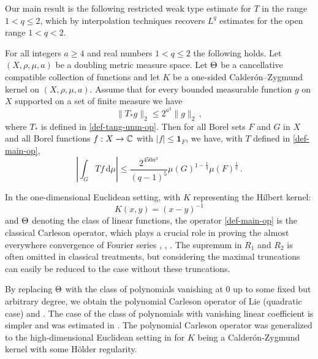 Our main result  is the following restricted weak type estimate for $T$ in the range $1<q\le 2$, which by interpolation techniques recovers $L^q$ estimates for the open range
$1<q<2$.
\begin{theorem}
\label{metric-space-Carleson}
    For all  integers $a \ge  4$ and  real numbers $1<q\le 2$
    the following holds.
    Let $(X,\rho,\mu,a)$ be a doubling metric measure space. Let  ${\Theta}$ be a
    cancellative compatible  collection of functions and let $K$ be a one-sided Calder\'on--Zygmund kernel on $(X,\rho,\mu,a)$. Assume  that for every bounded measurable function $g$ on $X$ supported on a set of finite measure we have
    \begin{equation}\label{nontanbound}
        \|T_{*}g\|_{2} \leq 2^{a^3} \|g\|_2\,,
    \end{equation}
    where $T_{*}$ is defined in
\eqref{def-tang-unm-op}.
    Then for all Borel sets $F$ and $G$ in $X$ and
    all Borel functions $f:X\to {\mathbb{C}}$ with
    $|f|\le \mathbf{1}_F$, we have, with $T$ defined in  \eqref{def-main-op},
    \begin{equation}
    \label{resweak}
        \left|\int_{G} T f \, \mathrm{d}\mu\right| \leq \frac{2^{450a^3}}{(q-1)^5} \mu(G)^{1-\frac{1}{q}} \mu(F)^{\frac{1}{q}}\, .
        \end{equation}
\end{theorem}

In the one-dimensional Euclidean setting, with $K$ representing the Hilbert kernel:
\begin{equation*}
K(x,y)=(x-y)^{-1}
\end{equation*}
and ${\Theta}$ denoting the class of linear functions, the operator \eqref{def-main-op} is the classical Carleson operator, which plays a crucial role in proving the almost everywhere convergence of Fourier series \cite{carleson}, \cite{fefferman}, \cite{lacey-thiele}. The supremum in $R_1$ and $R_2$ is often omitted in classical treatments, but considering the maximal truncations can easily be reduced to the case without these truncations.

By replacing ${\Theta}$ with the class of polynomials vanishing at $0$ up to some fixed but arbitrary degree, we obtain the polynomial Carleson operator of Lie \cite{lie-quadratic} (quadratic case) and \cite{lie-polynomial}. The case of the class of polynomials with vanishing linear coefficient is simpler and was estimated in \cite{stein-wainger}. The polynomial Carleson operator was generalized to the high-dimensional Euclidean setting in \cite{zk-polynomial} for $K$ being a Calderón-Zygmund kernel with some Hölder regularity.


